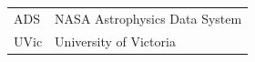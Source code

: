 
\noindent
\begin{tabular}{@{}l l@{}}
    ADS  & NASA Astrophysics Data System \\
    UVic & University of Victoria \\
\end{tabular}
